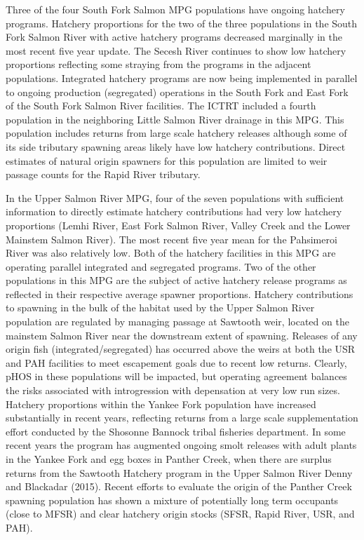 \documentclass[
  letterpaper,
  oneside,
  open=any]{scrbook}
\begin{document}
Three of the four South Fork Salmon MPG populations have ongoing
hatchery programs. Hatchery proportions for the two of the three
populations in the South Fork Salmon River with active hatchery programs
decreased marginally in the most recent five year update. The Secesh
River continues to show low hatchery proportions reflecting some
straying from the programs in the adjacent populations. Integrated
hatchery programs are now being implemented in parallel to ongoing
production (segregated) operations in the South Fork and East Fork of
the South Fork Salmon River facilities. The ICTRT included a fourth
population in the neighboring Little Salmon River drainage in this MPG.
This population includes returns from large scale hatchery releases
although some of its side tributary spawning areas likely have low
hatchery contributions. Direct estimates of natural origin spawners for
this population are limited to weir passage counts for the Rapid River
tributary.

In the Upper Salmon River MPG, four of the seven populations with
sufficient information to directly estimate hatchery contributions had
very low hatchery proportions (Lemhi River, East Fork Salmon River,
Valley Creek and the Lower Mainstem Salmon River). The most recent five
year mean for the Pahsimeroi River was also relatively low. Both of the
hatchery facilities in this MPG are operating parallel integrated and
segregated programs. Two of the other populations in this MPG are the
subject of active hatchery release programs as reflected in their
respective average spawner proportions. Hatchery contributions to
spawning in the bulk of the habitat used by the Upper Salmon River
population are regulated by managing passage at Sawtooth weir, located
on the mainstem Salmon River near the downstream extent of spawning.
Releases of any origin fish (integrated/segregated) has occurred above
the weirs at both the USR and PAH facilities to meet escapement goals
due to recent low returns. Clearly, pHOS in these populations will be
impacted, but operating agreement balances the risks associated with
introgression with depensation at very low run sizes. Hatchery
proportions within the Yankee Fork population have increased
substantially in recent years, reflecting returns from a large scale
supplementation effort conducted by the Shosonne Bannock tribal
fisheries department. In some recent years the program has augmented
ongoing smolt releases with adult plants in the Yankee Fork and egg
boxes in Panther Creek, when there are surplus returns from the Sawtooth
Hatchery program in the Upper Salmon River Denny and Blackadar (2015).
Recent efforts to evaluate the origin of the Panther Creek spawning
population has shown a mixture of potentially long term occupants (close
to MFSR) and clear hatchery origin stocks (SFSR, Rapid River, USR, and
PAH).
\end{document}

